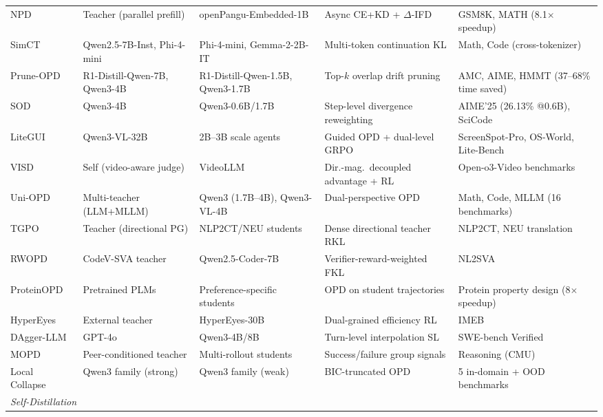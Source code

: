 \documentclass{article} %
\begin{document}
\begin{table}[t]
{\begin{tabular}{@{}lllll@{}}
        NPD~\citep{2605.05940} & Teacher (parallel prefill) & openPangu-Embedded-1B & Async CE+KD + $\Delta$-IFD & GSM8K, MATH (8.1$\times$ speedup) \\
        SimCT~\citep{2605.07711} & Qwen2.5-7B-Inst, Phi-4-mini & Phi-4-mini, Gemma-2-2B-IT & Multi-token continuation KL & Math, Code (cross-tokenizer) \\
        Prune-OPD~\citep{2605.07804} & R1-Distill-Qwen-7B, Qwen3-4B & R1-Distill-Qwen-1.5B, Qwen3-1.7B & Top-$k$ overlap drift pruning & AMC, AIME, HMMT (37--68\% time saved) \\
        SOD~\citep{2605.07725} & Qwen3-4B & Qwen3-0.6B/1.7B & Step-level divergence reweighting & AIME'25 (26.13\% @0.6B), SciCode \\
        LiteGUI~\citep{2605.07505} & Qwen3-VL-32B & 2B--3B scale agents & Guided OPD + dual-level GRPO & ScreenSpot-Pro, OS-World, Lite-Bench \\
        VISD~\citep{2605.06094} & Self (video-aware judge) & VideoLLM & Dir.-mag.\ decoupled advantage + RL & Open-o3-Video benchmarks \\
        Uni-OPD~\citep{2605.03677} & Multi-teacher (LLM+MLLM) & Qwen3 (1.7B--4B), Qwen3-VL-4B & Dual-perspective OPD & Math, Code, MLLM (16 benchmarks) \\
        TGPO~\citep{2605.13230} & Teacher (directional PG) & NLP2CT/NEU students & Dense directional teacher RKL & NLP2CT, NEU translation \\
        RWOPD~\citep{2605.13501} & CodeV-SVA teacher & Qwen2.5-Coder-7B & Verifier-reward-weighted FKL & NL2SVA \\
        ProteinOPD~\citep{2605.10189} & Pretrained PLMs & Preference-specific students & OPD on student trajectories & Protein property design (8$\times$ speedup) \\
        HyperEyes~\citep{2605.07177} & External teacher & HyperEyes-30B & Dual-grained efficiency RL & IMEB \\
        DAgger-LLM~\citep{2605.12913} & GPT-4o & Qwen3-4B/8B & Turn-level interpolation SL & SWE-bench Verified \\
        MOPD~\citep{2605.12652} & Peer-conditioned teacher & Multi-rollout students & Success/failure group signals & Reasoning (CMU) \\
        Local Collapse~\citep{2605.13643} & Qwen3 family (strong) & Qwen3 family (weak) & BIC-truncated OPD & 5 in-domain + OOD benchmarks \\
        \midrule
        \multicolumn{5}{l}{\textit{Self-Distillation}} \\

\end{tabular}}
\end{table}
\end{document}
